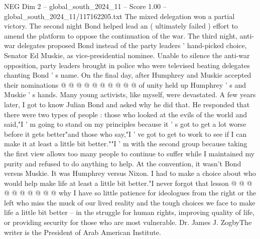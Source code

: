 \begin{textsample}{NEG Dim 2 – global\_south\_2024\_11 – Score 1.00 – global\_south\_2024\_11/117162205.txt}
The mixed delegation won a partial victory.
The second night Bond helped lead an ( ultimately failed ) effort to amend the platform to oppose the continuation of the war.
The third night, anti-war delegates proposed Bond instead of the party leaders ' hand-picked choice, Senator Ed Muskie, as vice-presidential nominee.
Unable to silence the anti-war opposition, party leaders brought in police who were televised beating delegates chanting Bond ' s name.
On the final day, after Humphrey and Muskie accepted their nominations @ @ @ @ @ @ @ @ @ @ of unity held up Humphrey ' s and Muskie ' s hands.
Many young activists, like myself, were devastated.
A few years later, I got to know Julian Bond and asked why he did that.
He responded that there were two types of people : those who looked at the evils of the world and said,"I ' m going to stand on my principles because it ' s got to get a lot worse before it gets better"and those who say,"I ' ve got to get to work to see if I can make it at least a little bit better.""I ' m with the second group because taking the first view allows too many people to continue to suffer while I maintained my purity and refused to do anything to help.
At the convention, it wasn't Bond versus Muskie.
It was Humphrey versus Nixon.
I had to make a choice about who would help make life at least a little bit better."I never forgot that lesson @ @ @ @ @ @ @ @ @ @ why I have so little patience for ideologues from the right or the left who miss the muck of our lived reality and the tough choices we face to make life a little bit better -- in the struggle for human rights, improving quality of life, or providing security for those who are most vulnerable.
Dr.
James J.
ZogbyThe writer is the President of Arab American Institute.

\end{textsample}
